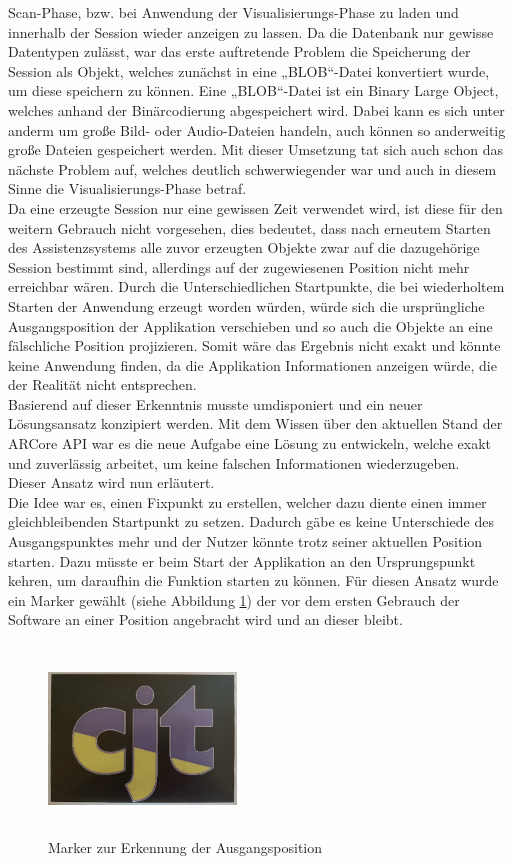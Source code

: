 Scan-Phase, bzw. bei Anwendung der Visualisierungs-Phase zu laden und innerhalb der Session wieder anzeigen zu lassen. Da die Datenbank nur gewisse Datentypen 
zulässt, war das erste auftretende Problem die Speicherung der Session als Objekt, welches zunächst in eine „BLOB“-Datei konvertiert wurde, um diese speichern 
zu können. Eine „BLOB“-Datei ist ein Binary Large Object, welches anhand der Binärcodierung abgespeichert wird. Dabei kann es sich unter anderm um große 
Bild- oder Audio-Dateien handeln, auch können so anderweitig große Dateien gespeichert werden. Mit dieser Umsetzung tat sich auch schon das nächste Problem auf, 
welches deutlich schwerwiegender war und auch in diesem Sinne die Visualisierungs-Phase betraf. 
\\ 
Da eine erzeugte Session nur eine gewissen Zeit verwendet wird, ist diese für den weitern Gebrauch nicht vorgesehen, dies bedeutet, dass nach erneutem Starten 
des Assistenzsystems alle zuvor erzeugten Objekte zwar auf die dazugehörige Session bestimmt sind, allerdings auf der zugewiesenen Position 
nicht mehr erreichbar wären. Durch die Unterschiedlichen Startpunkte, die bei wiederholtem Starten der Anwendung erzeugt worden würden, 
würde sich die ursprüngliche Ausgangsposition der Applikation verschieben und so auch die Objekte an eine fälschliche Position projizieren. Somit wäre das 
Ergebnis nicht exakt und könnte keine Anwendung finden, da die Applikation Informationen anzeigen würde, die der Realität nicht entsprechen. 
\\ 
Basierend auf dieser Erkenntnis musste umdisponiert und ein neuer Lösungsansatz konzipiert werden. Mit dem Wissen über den aktuellen Stand der ARCore \acs{API} 
war es die neue Aufgabe eine Lösung zu entwickeln, welche exakt und zuverlässig arbeitet, um keine falschen Informationen wiederzugeben. 
\\ 
Dieser Ansatz wird nun erläutert.
\\ 
\linebreak
Die Idee war es, einen Fixpunkt zu erstellen, welcher dazu diente einen immer gleichbleibenden Startpunkt zu setzen. Dadurch gäbe es keine Unterschiede des 
Ausgangspunktes mehr und der Nutzer könnte trotz seiner aktuellen Position starten. Dazu müsste er beim Start der Applikation an den Ursprungspunkt kehren, 
um daraufhin die Funktion starten zu können. Für diesen Ansatz wurde ein Marker gewählt (siehe Abbildung \ref{pic:initialMarker}) der vor dem ersten Gebrauch 
der Software an einer Position angebracht wird und an dieser bleibt. 
\begin{figure}[hbt!]
    \centering
    \includegraphics[width=5cm,height=5cm,keepaspectratio]{4Umsetzung/Bilder/cjt_logo_tracking.png}
    \caption{Marker zur Erkennung der Ausgangsposition}
    \label{pic:initialMarker}
\end{figure}
